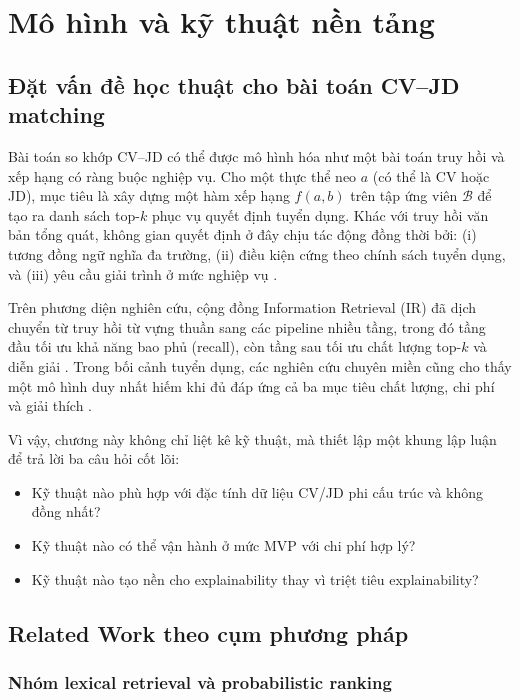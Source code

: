 \chapter{Mô hình và kỹ thuật nền tảng}

\section{Đặt vấn đề học thuật cho bài toán CV--JD matching}

Bài toán so khớp CV--JD có thể được mô hình hóa như một bài toán truy hồi và xếp hạng có ràng buộc nghiệp vụ. Cho một thực thể neo $a$ (có thể là CV hoặc JD), mục tiêu là xây dựng một hàm xếp hạng $f(a,b)$ trên tập ứng viên $\mathcal{B}$ để tạo ra danh sách top-$k$ phục vụ quyết định tuyển dụng. Khác với truy hồi văn bản tổng quát, không gian quyết định ở đây chịu tác động đồng thời bởi: (i) tương đồng ngữ nghĩa đa trường, (ii) điều kiện cứng theo chính sách tuyển dụng, và (iii) yêu cầu giải trình ở mức nghiệp vụ \cite{requirements,hld-matching,hld-api}.

Trên phương diện nghiên cứu, cộng đồng Information Retrieval (IR) đã dịch chuyển từ truy hồi từ vựng thuần sang các pipeline nhiều tầng, trong đó tầng đầu tối ưu khả năng bao phủ (recall), còn tầng sau tối ưu chất lượng top-$k$ và diễn giải \cite{prf-bm25,dpr,splade,colbertv2,hyrr}. Trong bối cảnh tuyển dụng, các nghiên cứu chuyên miền cũng cho thấy một mô hình duy nhất hiếm khi đủ đáp ứng cả ba mục tiêu chất lượng, chi phí và giải thích \cite{ibm-siamese-job,consultantbert,ai-hiring-context}.

Vì vậy, chương này không chỉ liệt kê kỹ thuật, mà thiết lập một khung lập luận để trả lời ba câu hỏi cốt lõi:

\begin{itemize}
  \item Kỹ thuật nào phù hợp với đặc tính dữ liệu CV/JD phi cấu trúc và không đồng nhất?
  \item Kỹ thuật nào có thể vận hành ở mức MVP với chi phí hợp lý?
  \item Kỹ thuật nào tạo nền cho explainability thay vì triệt tiêu explainability?
\end{itemize}

\section{Related Work theo cụm phương pháp}

\subsection{Nhóm lexical retrieval và probabilistic ranking}

